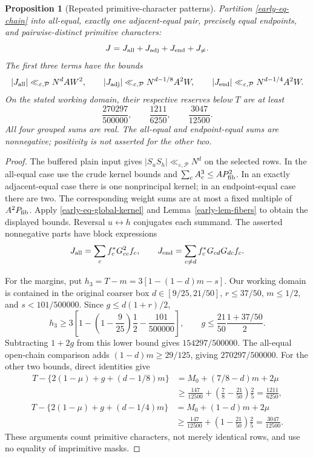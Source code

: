 \documentclass[11pt]{article}
\newtheorem{proposition}[theorem]{Proposition}
\theoremstyle{definition}
\newcommand{\eps}{\varepsilon}
\newcommand{\lls}{\ll_{\eps,\mathcal P}}
\begin{document}
\begin{proposition}[Repeated primitive-character patterns]
\label{early-prop-repeated}
Partition \eqref{early-eq-chain} into all-equal, exactly one
adjacent-equal pair, precisely equal endpoints, and pairwise-distinct
primitive characters:
\[
 J=J_{\rm all}+J_{\rm adj}+J_{\rm end}+J_{\ne}.
\]
The first three terms have the bounds
\[
 |J_{\rm all}|\lls N^dAW^2,\qquad
 |J_{\rm adj}|\lls N^{d-1/8}A^2W,\qquad
 |J_{\rm end}|\lls N^{d-1/4}A^2W.
\]
On the stated working domain, their respective reserves below \(T\)
are at least
\[
 \frac{270297}{500000},\qquad
 \frac{1211}{6250},\qquad
 \frac{3047}{12500}.
\]
All four grouped sums are real.  The all-equal and endpoint-equal
sums are nonnegative; positivity is not asserted for the other two.
\end{proposition}

\begin{proof}
The buffered plain input gives
\(|S_uS_h|\lls N^d\) on the selected rows.
In the all-equal case use the crude kernel bounds and
\(\sum_cA_c^3\le A P_{\rm fib}^2\).
In an exactly adjacent-equal case there is one nonprincipal kernel;
in an endpoint-equal case there are two.
The corresponding weight sums are at most a fixed multiple of
\(A^2P_{\rm fib}\).  Apply
\eqref{early-eq-global-kernel} and
Lemma~\ref{early-lem-fibers} to obtain the displayed bounds.
Reversal \(u\leftrightarrow h\) conjugates each summand.
The asserted nonnegative parts have block expressions
\[
 J_{\rm all}=\sum_cf_c^*G_{cc}^2f_c,\qquad
 J_{\rm end}=\sum_{c\ne d}f_c^*G_{cd}G_{dc}f_c.
\]

For the margins, put \(h_3=T-m=3[1-(1-d)m-s]\).
Our working domain is contained in the original coarser box
\(d\in[9/25,21/50]\), \(r\le37/50\), \(m\le1/2\), and
\(s<101/500000\).  Since \(g\le d(1+r)/2\),
\[
 h_3\ge3\left[1-\left(1-\frac9{25}\right)\frac12
                         -\frac{101}{500000}\right],\qquad
 g\le\frac{21}{50}\frac{1+37/50}{2}.
\]
Subtracting \(1+2g\) from this lower bound gives
\(154297/500000\).  The all-equal open-chain comparison adds
\((1-d)m\ge29/125\), giving \(270297/500000\).
For the other two bounds, direct identities give
\[
 \begin{split}
 T-\{2(1-\mu)+g+(d-1/8)m\}
   &=M_0+(7/8-d)m+2\mu\\
   &\ge\frac{147}{12500}
             +\left(\frac78-\frac{21}{50}\right)\frac25
      =\frac{1211}{6250},
 \end{split}
\]
\[
 \begin{split}
 T-\{2(1-\mu)+g+(d-1/4)m\}
   &=M_0+(1-d)m+2\mu\\
   &\ge\frac{147}{12500}
             +\left(1-\frac{21}{50}\right)\frac25
      =\frac{3047}{12500}.
 \end{split}
\]
These arguments count primitive characters, not merely identical rows,
and use no equality of imprimitive masks.
\end{proof}
\end{document}
